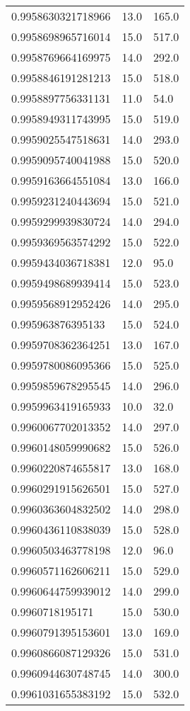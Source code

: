 \begin{center}
\begin{supertabular}[H]{p{0.30\textwidth}p{0.05\textwidth}p{0.05\textwidth}}
0.9958630321718966 & 13.0 & 165.0 \\ 
0.9958698965716014 & 15.0 & 517.0 \\ 
0.9958769664169975 & 14.0 & 292.0 \\ 
0.9958846191281213 & 15.0 & 518.0 \\ 
0.9958897756331131 & 11.0 & 54.0 \\ 
0.9958949311743995 & 15.0 & 519.0 \\ 
0.9959025547518631 & 14.0 & 293.0 \\ 
0.9959095740041988 & 15.0 & 520.0 \\ 
0.9959163664551084 & 13.0 & 166.0 \\ 
0.9959231240443694 & 15.0 & 521.0 \\ 
0.9959299939830724 & 14.0 & 294.0 \\ 
0.9959369563574292 & 15.0 & 522.0 \\ 
0.9959434036718381 & 12.0 & 95.0 \\ 
0.9959498689939414 & 15.0 & 523.0 \\ 
0.9959568912952426 & 14.0 & 295.0 \\ 
0.995963876395133 & 15.0 & 524.0 \\ 
0.9959708362364251 & 13.0 & 167.0 \\ 
0.9959780086095366 & 15.0 & 525.0 \\ 
0.9959859678295545 & 14.0 & 296.0 \\ 
0.9959963419165933 & 10.0 & 32.0 \\ 
0.9960067702013352 & 14.0 & 297.0 \\ 
0.9960148059990682 & 15.0 & 526.0 \\ 
0.9960220874655817 & 13.0 & 168.0 \\ 
0.9960291915626501 & 15.0 & 527.0 \\ 
0.9960363604832502 & 14.0 & 298.0 \\ 
0.9960436110838039 & 15.0 & 528.0 \\ 
0.9960503463778198 & 12.0 & 96.0 \\ 
0.9960571162606211 & 15.0 & 529.0 \\ 
0.9960644759939012 & 14.0 & 299.0 \\ 
0.9960718195171 & 15.0 & 530.0 \\ 
0.9960791395153601 & 13.0 & 169.0 \\ 
0.9960866087129326 & 15.0 & 531.0 \\ 
0.9960944630748745 & 14.0 & 300.0 \\ 
0.9961031655383192 & 15.0 & 532.0 \\ 

\end{supertabular}
\end{center}
